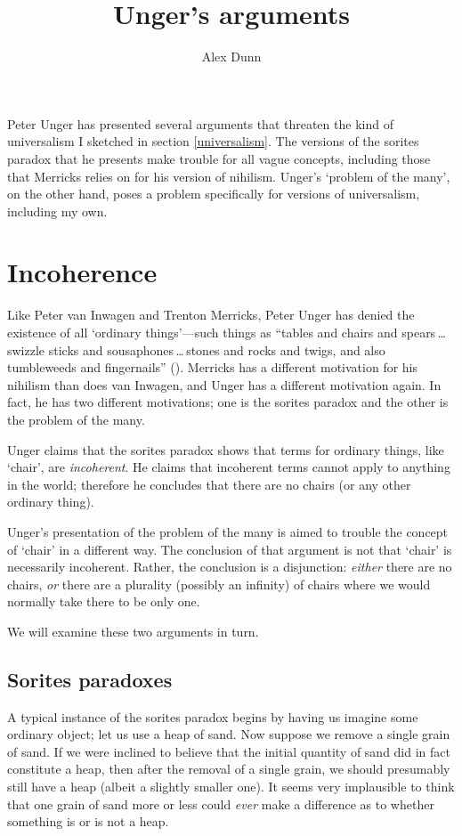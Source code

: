 \documentclass[11pt]{article}
\title{Unger's arguments}
\author{Alex Dunn}
\begin{document}
\ifstandalone
\maketitle
\begin{spacing}{1.5}
\fi

Peter Unger has presented several arguments that threaten the kind of
universalism I sketched in section \ref{universalism}.  The versions
of the sorites paradox that he presents make trouble for all vague
concepts, including those that Merricks relies on for his version of
nihilism.  Unger's `problem of the many', on the other hand, poses a
problem specifically for versions of universalism, including my own.

\section{Incoherence}
\label{unger}
Like Peter van Inwagen and Trenton Merricks, Peter Unger has denied
the existence of all `ordinary things'---such things as ``tables and
chairs and spears\,\ldots swizzle sticks and
sousaphones\,\ldots\,stones and rocks and twigs, and also tumbleweeds
and fingernails'' (\citeyear[117]{unger1979}).  Merricks has a
different motivation for his nihilism than does van Inwagen, and Unger
has a different motivation again.  In fact, he has two different
motivations; one is the sorites paradox and the other is the problem
of the many.  

Unger claims that the sorites paradox shows that terms
for ordinary things, like `chair', are {\em incoherent}.  He claims
that incoherent terms cannot apply to anything in the world; therefore
he concludes that there are no chairs (or any other ordinary thing).

Unger's presentation of the problem of the many is aimed to trouble
the concept of `chair' in a different way.  The conclusion of that
argument is not that `chair' is necessarily incoherent.  Rather, the
conclusion is a disjunction: {\em either} there are no chairs, {\em
  or} there are a plurality (possibly an infinity) of chairs where we
would normally take there to be only one.

We will examine these two arguments in turn.

\subsection{Sorites paradoxes}
\label{sorites}
A typical instance of the sorites paradox begins by having us imagine
some ordinary object; let us use a heap of sand.  Now suppose we
remove a single grain of sand.  If we were inclined to believe that
the initial quantity of sand did in fact constitute a heap, then after
the removal of a single grain, we should presumably still have a heap
(albeit a slightly smaller one).  It seems very implausible to think
that one grain of sand more or less could {\em ever} make a difference
as to whether something is or is not a heap.


\end{spacing}
\end{document}
